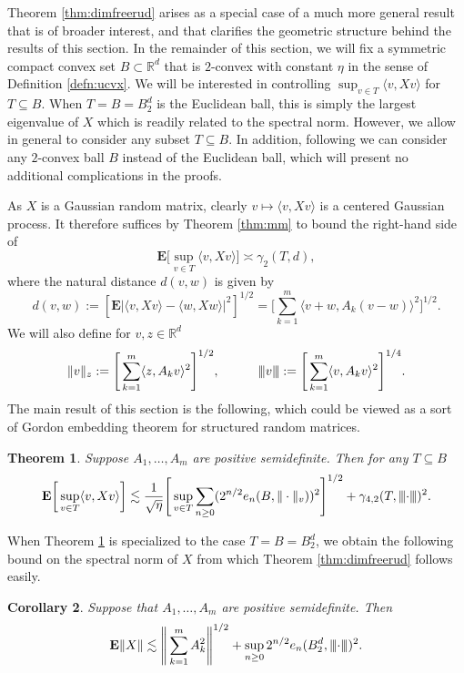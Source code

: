 \documentclass[10pt,reqno]{amsart}
\newtheorem{thm}{Theorem}[section]
\newtheorem{cor}[thm]{Corollary}
\theoremstyle{definition}
\numberwithin{equation}{section}
\numberwithin{figure}{section}
\numberwithin{table}{section}
\newcommand{\mynegspace}{\hspace{-0.12em}}
\newcommand{\vvv}{\rvert\mynegspace\rvert\mynegspace\rvert}
\newcommand{\nnn}[1]{{\vvv #1 \vvv}}
\begin{document}
Theorem \ref{thm:dimfreerud} arises as a special case of a much more 
general result that is of broader interest, and that clarifies the 
geometric structure behind the results of this section. In the remainder 
of this section, we will fix a symmetric compact convex set 
$B\subset\mathbb{R}^d$ that is $2$-convex with constant $\eta$ in the 
sense of Definition \ref{defn:ucvx}. We will be interested in controlling 
$\sup_{v\in T}\langle v,Xv\rangle$ for $T\subseteq B$. When $T=B=B_2^d$ is 
the Euclidean ball, this is simply the largest eigenvalue of $X$ which is 
readily related to the spectral norm. However, we allow in general to 
consider any subset $T\subseteq B$. In addition, following 
\cite{GR07,GMPT08} we can consider any $2$-convex ball $B$ instead of the 
Euclidean ball, which will present no additional complications in the 
proofs.

As $X$ is a Gaussian random matrix, clearly $v\mapsto\langle v,Xv\rangle$
is a centered Gaussian process. It therefore suffices by Theorem 
\ref{thm:mm} to bound the right-hand side of
$$
	\mathbf{E}\bigg[\sup_{v\in T}\langle v,Xv\rangle\bigg]
	\asymp \gamma_2(T,d),
$$
where the natural distance $d(v,w)$ is given by
$$
	d(v,w) := [\mathbf{E}|\langle v,Xv\rangle-
	\langle w,Xw\rangle|^2]^{1/2} =
	\Bigg[\sum_{k=1}^m \langle v+w,A_k(v-w)\rangle^2\Bigg]^{1/2}.
$$
We will also define for $v,z\in\mathbb{R}^d$
$$
	\|v\|_z := 
	\Bigg[\sum_{k=1}^m \langle z,A_kv\rangle^2\Bigg]^{1/2},
	\qquad\quad
        \nnn{v} := \Bigg[
        \sum_{k=1}^m \langle v,A_kv\rangle^2\Bigg]^{1/4}.
$$
The main result of this section is the 
following, which could be viewed as a sort of Gordon embedding 
theorem \cite[Theorem 16.9.1]{Tal14} for structured random matrices.

\begin{thm}
\label{thm:gordon}
Suppose $A_1,\ldots,A_m$ are positive semidefinite. Then
for any $T\subseteq B$
$$
	\mathbf{E}\bigg[\sup_{v\in T}\langle v,Xv\rangle\bigg] \lesssim
	\frac{1}{\sqrt{\eta}}
	\Bigg[
	\sup_{v\in T}
	\sum_{n\ge 0}(2^{n/2}e_n(B,\|\cdot\|_v))^2
	\Bigg]^{1/2} +
	\gamma_{4,2}(T,\nnn{\cdot})^2.
$$
\end{thm}

When Theorem \ref{thm:gordon} is specialized to the case $T=B=B_2^d$, 
we obtain the following bound on the spectral norm of $X$ from which
Theorem \ref{thm:dimfreerud} follows easily.

\begin{cor}
\label{cor:supernck}
Suppose that $A_1,\ldots,A_m$ are positive semidefinite. Then
$$
	\mathbf{E}\|X\| \lesssim
	\Bigg\|\sum_{k=1}^m A_k^2 \Bigg\|^{1/2}
	+ \sup_{n\ge 0}2^{n/2}e_n(B_2^d,\nnn{\cdot})^2.
$$
\end{cor}
\end{document}
